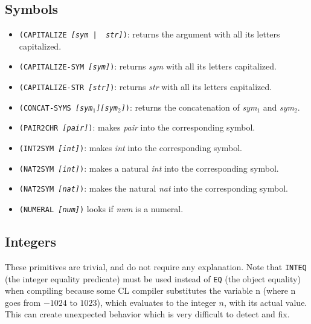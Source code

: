 \subsection{Symbols}

\begin{itemize}
    \item {\tt (CAPITALIZE {\it [sym {\tt | } str]})}:
        returns the argument with all its letters capitalized.
    \item {\tt (CAPITALIZE-SYM {\it [sym]})}:
        returns {\it sym} with all its letters capitalized.
    \item {\tt (CAPITALIZE-STR {\it [str]})}:
        returns {\it str} with all its letters capitalized.
    \item {\tt (CONCAT-SYMS {\it [sym$_1$][sym$_2$]})}:
        returns the concatenation of {\it sym$_1$} and {\it sym$_2$}.
    \item {\tt  (PAIR2CHR {\it [pair]})}:
        makes {\it pair} into the corresponding symbol.
    \item {\tt  (INT2SYM {\it [int]})}:
        makes {\it int} into the corresponding symbol.
    \item {\tt  (NAT2SYM {\it [int]})}:
        makes a natural {\it int} into the corresponding symbol.
    \item {\tt  (NAT2SYM {\it [nat]})}:
        makes the natural {\it nat} into the corresponding symbol.
    \item {\tt (NUMERAL {\it [num]})}
        looks if {\it num} is a numeral.
\end{itemize}


\subsection{Integers}

These primitives are trivial, and do not require any explanation.
Note that {\tt INTEQ} (the integer equality predicate) must be used instead of
{\tt EQ} (the object equality) when compiling because some CL compiler
substitutes the variable n (where n goes from $-1024$ to $1023$), which
evaluates to the integer $n$, with its actual value. This can create unexpected
behavior which is very difficult to detect and fix.

